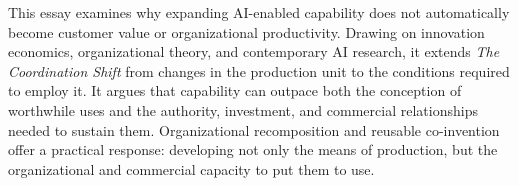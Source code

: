 This essay examines why expanding AI-enabled capability does not
automatically become customer value or organizational productivity.
Drawing on innovation economics, organizational theory, and contemporary
AI research, it extends \emph{The Coordination Shift} from changes in
the production unit to the conditions required to employ it. It argues
that capability can outpace both the conception of worthwhile uses and
the authority, investment, and commercial relationships needed to
sustain them. Organizational recomposition and reusable co-invention
offer a practical response: developing not only the means of production,
but the organizational and commercial capacity to put them to use.

